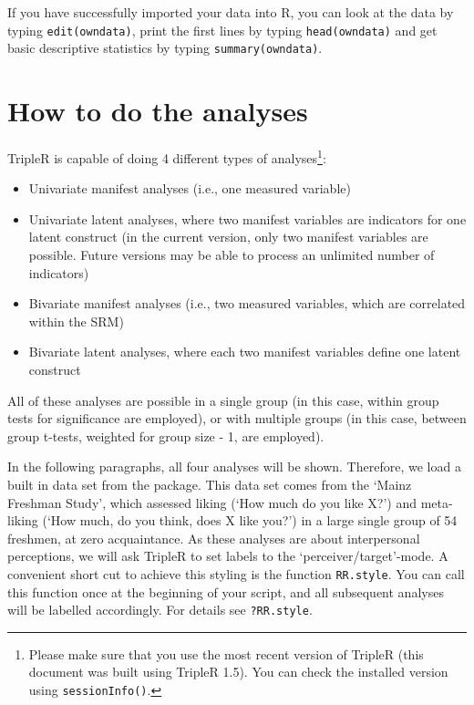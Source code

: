 \documentclass[a4paper]{article}\usepackage[]{graphicx}\usepackage[]{color}
\begin{document}
If you have successfully imported your data into R, you can look at the data by typing \texttt{edit(owndata)}, print the first lines by typing \texttt{head(owndata)} and get basic descriptive statistics by typing \texttt{summary(owndata)}.



\section{How to do the analyses}
TripleR is capable of doing 4 different types of analyses\footnote{Please make sure that you use the most recent version of TripleR (this document was built using TripleR 1.5). You can check the installed version using \texttt{sessionInfo()}.}:
\begin{itemize}

	\item Univariate manifest analyses (i.e., one measured variable)

	\item Univariate latent analyses, where two manifest variables are indicators for one latent construct (in the current version, only two manifest variables are possible. Future versions may be able to process an unlimited number of indicators)

	\item Bivariate manifest analyses (i.e., two measured variables, which are correlated within the SRM)

	\item Bivariate latent analyses, where each two manifest variables define one latent construct
\end{itemize}


All of these analyses are possible in a single group (in this case, within group tests for significance are employed), or with multiple groups (in this case, between group t-tests, weighted for group size - 1, are employed).


In the following paragraphs, all four analyses will be shown. Therefore, we load a built in data set from the package. This data set comes from the `Mainz Freshman Study', which assessed liking (`How much do you like X?') and meta-liking (`How much, do you think, does X like you?') in a large single group of 54 freshmen, at zero acquaintance. 
As these analyses are about interpersonal perceptions, we will ask TripleR to set labels to the `perceiver/target'-mode. A convenient short cut to achieve this styling is the function \texttt{RR.style}. You can call this function once at the beginning of your script, and all subsequent analyses will be labelled accordingly. For details see \texttt{?RR.style}.
\end{document}
